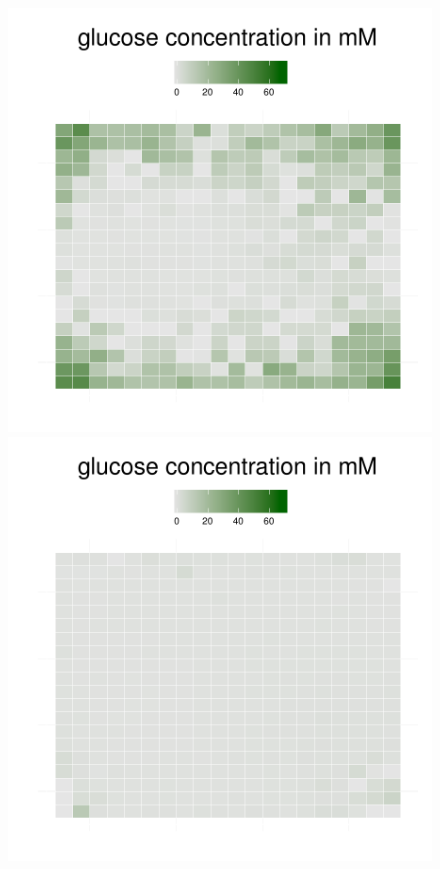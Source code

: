 \begin{figure}[h!]
{\begin{minipage}[t]{0.3\textwidth}
  \end{minipage}
  \begin{minipage}[t]{0.3\textwidth}
    \includegraphics[width=\textwidth]{../results/img/ecoli_beijerinckii_20x20_seed5147_glc55.pdf}
  \end{minipage}
  \begin{minipage}[t]{0.3\textwidth}
    \includegraphics[width=\textwidth]{../results/img/ecoli_beijerinckii_20x20_seed5147_glc65.pdf}

\end{minipage}}
\end{figure}
